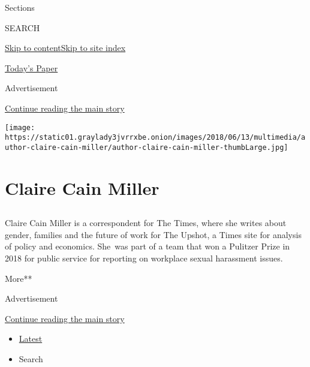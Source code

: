 Sections

SEARCH

\protect\hyperlink{site-content}{Skip to
content}\protect\hyperlink{site-index}{Skip to site index}

\href{https://myaccount.nytimes3xbfgragh.onion/auth/login?response_type=cookie\&client_id=vi}{}

\href{https://www.nytimes3xbfgragh.onion/section/todayspaper}{Today's
Paper}

Advertisement

\protect\hyperlink{after-top}{Continue reading the main story}

\texttt{[image: https://static01.graylady3jvrrxbe.onion/images/2018/06/13/multimedia/author-claire-cain-miller/author-claire-cain-miller-thumbLarge.jpg]}

\hypertarget{claire-cain-miller}{%
\section{Claire Cain Miller}\label{claire-cain-miller}}

\subsection{}

Claire Cain Miller is a correspondent for The Times, where she writes
about gender, families and the future of work for The Upshot, a Times
site for analysis of policy and economics. She~was part of a team that
won a Pulitzer Prize in 2018 for public service for reporting on
workplace sexual harassment issues.

More**

Advertisement

\protect\hyperlink{after-mid1}{Continue reading the main story}

\begin{itemize}
\tightlist
\item
  \protect\hyperlink{stream-panel}{Latest}
\item
  Search
\end{itemize}

